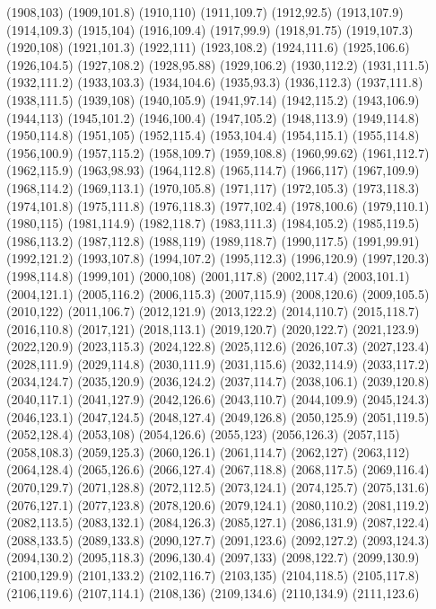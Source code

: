(1908,103)
(1909,101.8)
(1910,110)
(1911,109.7)
(1912,92.5)
(1913,107.9)
(1914,109.3)
(1915,104)
(1916,109.4)
(1917,99.9)
(1918,91.75)
(1919,107.3)
(1920,108)
(1921,101.3)
(1922,111)
(1923,108.2)
(1924,111.6)
(1925,106.6)
(1926,104.5)
(1927,108.2)
(1928,95.88)
(1929,106.2)
(1930,112.2)
(1931,111.5)
(1932,111.2)
(1933,103.3)
(1934,104.6)
(1935,93.3)
(1936,112.3)
(1937,111.8)
(1938,111.5)
(1939,108)
(1940,105.9)
(1941,97.14)
(1942,115.2)
(1943,106.9)
(1944,113)
(1945,101.2)
(1946,100.4)
(1947,105.2)
(1948,113.9)
(1949,114.8)
(1950,114.8)
(1951,105)
(1952,115.4)
(1953,104.4)
(1954,115.1)
(1955,114.8)
(1956,100.9)
(1957,115.2)
(1958,109.7)
(1959,108.8)
(1960,99.62)
(1961,112.7)
(1962,115.9)
(1963,98.93)
(1964,112.8)
(1965,114.7)
(1966,117)
(1967,109.9)
(1968,114.2)
(1969,113.1)
(1970,105.8)
(1971,117)
(1972,105.3)
(1973,118.3)
(1974,101.8)
(1975,111.8)
(1976,118.3)
(1977,102.4)
(1978,100.6)
(1979,110.1)
(1980,115)
(1981,114.9)
(1982,118.7)
(1983,111.3)
(1984,105.2)
(1985,119.5)
(1986,113.2)
(1987,112.8)
(1988,119)
(1989,118.7)
(1990,117.5)
(1991,99.91)
(1992,121.2)
(1993,107.8)
(1994,107.2)
(1995,112.3)
(1996,120.9)
(1997,120.3)
(1998,114.8)
(1999,101)
(2000,108)
(2001,117.8)
(2002,117.4)
(2003,101.1)
(2004,121.1)
(2005,116.2)
(2006,115.3)
(2007,115.9)
(2008,120.6)
(2009,105.5)
(2010,122)
(2011,106.7)
(2012,121.9)
(2013,122.2)
(2014,110.7)
(2015,118.7)
(2016,110.8)
(2017,121)
(2018,113.1)
(2019,120.7)
(2020,122.7)
(2021,123.9)
(2022,120.9)
(2023,115.3)
(2024,122.8)
(2025,112.6)
(2026,107.3)
(2027,123.4)
(2028,111.9)
(2029,114.8)
(2030,111.9)
(2031,115.6)
(2032,114.9)
(2033,117.2)
(2034,124.7)
(2035,120.9)
(2036,124.2)
(2037,114.7)
(2038,106.1)
(2039,120.8)
(2040,117.1)
(2041,127.9)
(2042,126.6)
(2043,110.7)
(2044,109.9)
(2045,124.3)
(2046,123.1)
(2047,124.5)
(2048,127.4)
(2049,126.8)
(2050,125.9)
(2051,119.5)
(2052,128.4)
(2053,108)
(2054,126.6)
(2055,123)
(2056,126.3)
(2057,115)
(2058,108.3)
(2059,125.3)
(2060,126.1)
(2061,114.7)
(2062,127)
(2063,112)
(2064,128.4)
(2065,126.6)
(2066,127.4)
(2067,118.8)
(2068,117.5)
(2069,116.4)
(2070,129.7)
(2071,128.8)
(2072,112.5)
(2073,124.1)
(2074,125.7)
(2075,131.6)
(2076,127.1)
(2077,123.8)
(2078,120.6)
(2079,124.1)
(2080,110.2)
(2081,119.2)
(2082,113.5)
(2083,132.1)
(2084,126.3)
(2085,127.1)
(2086,131.9)
(2087,122.4)
(2088,133.5)
(2089,133.8)
(2090,127.7)
(2091,123.6)
(2092,127.2)
(2093,124.3)
(2094,130.2)
(2095,118.3)
(2096,130.4)
(2097,133)
(2098,122.7)
(2099,130.9)
(2100,129.9)
(2101,133.2)
(2102,116.7)
(2103,135)
(2104,118.5)
(2105,117.8)
(2106,119.6)
(2107,114.1)
(2108,136)
(2109,134.6)
(2110,134.9)
(2111,123.6)
